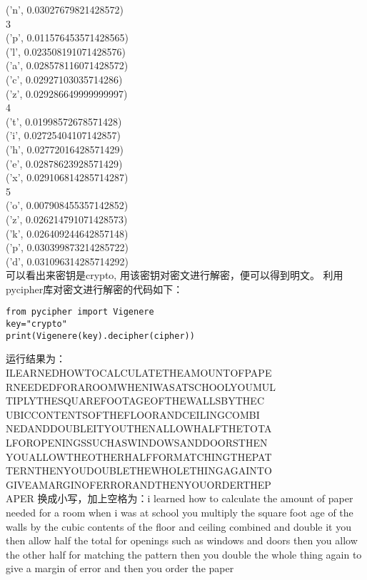 \documentclass{article}
\begin{document}
('n', 0.03027679821428572)\\
3\\
('p', 0.011576453571428565)\\
('l', 0.023508191071428576)\\
('a', 0.028578116071428572)\\
('c', 0.02927103035714286)\\
('z', 0.029286649999999997)\\
4\\
('t', 0.01998572678571428)\\
('i', 0.02725404107142857)\\
('h', 0.02772016428571429)\\
('e', 0.02878623928571429)\\
('x', 0.029106814285714287)\\
5\\
('o', 0.007908455357142852)\\
('z', 0.026214791071428573)\\
('k', 0.026409244642857148)\\
('p', 0.030399873214285722)\\
('d', 0.031096314285714292)\\

可以看出来密钥是crypto, 用该密钥对密文进行解密，便可以得到明文。
利用pycipher库对密文进行解密的代码如下：
\begin{lstlisting}[title=decipher.py, frame=shadowbox]
from pycipher import Vigenere
key="crypto"
print(Vigenere(key).decipher(cipher))
\end{lstlisting}

运行结果为：\\
ILEARNEDHOWTOCALCULATETHEAMOUNTOFPAPE\\
RNEEDEDFORAROOMWHENIWASATSCHOOLYOUMUL\\
TIPLYTHESQUAREFOOTAGEOFTHEWALLSBYTHEC\\
UBICCONTENTSOFTHEFLOORANDCEILINGCOMBI\\
NEDANDDOUBLEITYOUTHENALLOWHALFTHETOTA\\
LFOROPENINGSSUCHASWINDOWSANDDOORSTHEN\\
YOUALLOWTHEOTHERHALFFORMATCHINGTHEPAT\\
TERNTHENYOUDOUBLETHEWHOLETHINGAGAINTO\\
GIVEAMARGINOFERRORANDTHENYOUORDERTHEP\\
APER
换成小写，加上空格为：i learned how to calculate the amount of paper needed for a room when i was at school you multiply the square foot age of the walls by the cubic contents of the floor and ceiling combined and double it you then allow half the total for openings such as windows and doors then you allow the other half for matching the pattern then you double the whole thing again to give a margin of error and then you order the paper
\end{document}
